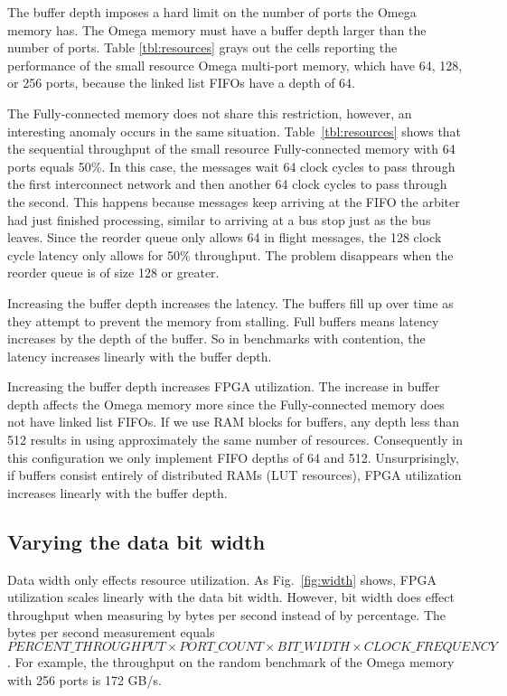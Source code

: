 The buffer depth imposes a hard limit on the number of ports the Omega memory has. The Omega memory must have a buffer depth larger than the number of ports. Table \ref{tbl:resources} grays out the cells reporting the performance of the small resource Omega multi-port memory, which have 64, 128, or 256 ports, because the linked list FIFOs have a depth of 64.

The Fully-connected memory does not share this restriction, however, an interesting anomaly occurs in the same situation. Table~\ref{tbl:resources} shows that the sequential throughput of the small resource Fully-connected memory with 64 ports equals 50\%. In this case, the messages wait 64 clock cycles to pass through the first interconnect network and then another 64 clock cycles to pass through the second. This happens because messages keep arriving at the FIFO the arbiter had just finished processing, similar to arriving at a bus stop just as the bus leaves. Since the reorder queue only allows 64 in flight messages, the 128 clock cycle latency only allows for 50\% throughput. The problem disappears when the reorder queue is of size 128 or greater.

Increasing the buffer depth increases the latency. The buffers fill up over time as they attempt to prevent the memory from stalling. Full buffers means latency increases by the depth of the buffer. So in benchmarks with contention, the latency increases linearly with the buffer depth.

Increasing the buffer depth increases FPGA utilization. The increase in buffer depth affects the Omega memory more since the Fully-connected memory does not have linked list FIFOs. If we use RAM blocks for buffers, any depth less than 512 results in using approximately the same number of resources. Consequently in this configuration we only implement FIFO depths of 64 and 512. Unsurprisingly, if buffers consist entirely of distributed RAMs (LUT resources), FPGA utilization increases linearly with the buffer depth.

\subsection{Varying the data bit width} Data width only effects resource utilization. As Fig.~\ref{fig:width} shows, FPGA utilization scales linearly with the data bit width. However, bit width does effect throughput when measuring by bytes per second instead of by percentage. The bytes per second measurement equals $PERCENT\_THROUGHPUT \times PORT\_COUNT \times BIT\_WIDTH \times CLOCK\_FREQUENCY$. For example, the throughput on the random benchmark of the Omega memory with 256 ports is 172 GB/s.



